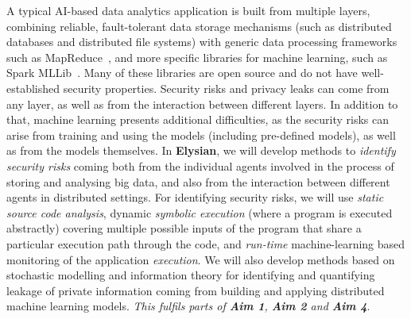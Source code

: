 \documentclass[a4paper,11pt]{article}
\newcommand{\project}[1]{\textbf{#1}\xspace}
\newcommand{\SECURITY}{\project{Elysian}}
\newcommand{\TheProject}{\SECURITY}
\begin{document}
A typical AI-based data analytics application is built from multiple layers, combining reliable, fault-tolerant data storage mechanisms (such as distributed databases and distributed file systems) with generic data processing frameworks such as MapReduce~\cite{mapreduce}, and more specific libraries for machine learning, such as Spark MLLib~\cite{mllib}. Many of these libraries are open source and do not have well-established security properties. Security risks and privacy leaks can come from any layer, as well as from the interaction between different layers. In addition to that, machine learning presents additional difficulties, as the security risks can arise from training and using the models (including pre-defined models), as well as from the models themselves. In \TheProject{},  we will develop methods to \emph{identify security risks} coming both from the individual agents involved in the process of storing and analysing big data, and also from the interaction between different agents in distributed settings. For identifying security risks, we will use \emph{static source code analysis}, dynamic \emph{symbolic execution} (where a program is executed abstractly) covering multiple possible inputs of the program that share a particular execution path through the code, and \emph{run-time} machine-learning based monitoring of the application \emph{execution}. We will also develop methods based on stochastic modelling and information theory for identifying and quantifying leakage of private information coming from building and applying distributed machine learning models. \emph{This fulfils parts of \textbf{Aim 1}, \textbf{Aim 2} and \textbf{Aim 4}}.
\end{document}
